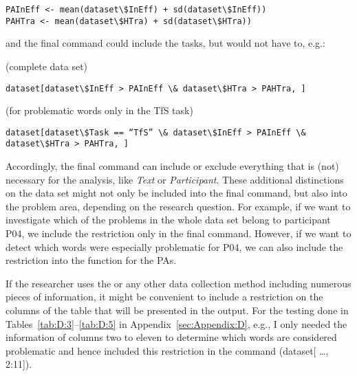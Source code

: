 \ea
\begin{lstlisting}
PAInEff <- mean(dataset\$InEff) + sd(dataset\$InEff))
PAHTra <- mean(dataset\$HTra) + sd(dataset\$HTra))
\end{lstlisting}
\z


and the final command could include the tasks, but would not have to, e.g.:


\ea\textup{(complete data set)}\\
\begin{lstlisting}
dataset[dataset\$InEff > PAInEff \& dataset\$HTra > PAHTra, ]
\end{lstlisting}
\z

\ea\textup{(for problematic words only in the TfS task)}\\
\begin{lstlisting}
dataset[dataset\$Task == “TfS” \& dataset\$InEff > PAInEff \& dataset\$HTra > PAHTra, ]
\end{lstlisting}
\z


\textup{Accordingly, the final command can include or exclude everything that is (not) necessary for the analysis, like} \textit{Text} \textup{or} \textit{Participant}\textup{. These additional distinctions on the data set might not only be included into the final command, but also into the problem area, depending on the research question. For example, if we want to investigate which of the problems in the whole data set belong to participant P04, we include the restriction only in the final command. However, if we want to detect which words were especially problematic for P04, we can also include the restriction into the function for the PAs.}



If the researcher uses the  or any other data collection method including numerous pieces of information, it might be convenient to include a restriction on the columns of the table that will be presented in the output. For the testing done in Tables~\ref{tab:D:3}--\ref{tab:D:5} in Appendix~\ref{sec:Appendix:D}, e.g., I only needed the information of columns two to eleven to determine which words are considered problematic and hence included this restriction in the command ({\ttfamily dataset[ …, 2:11]}).



